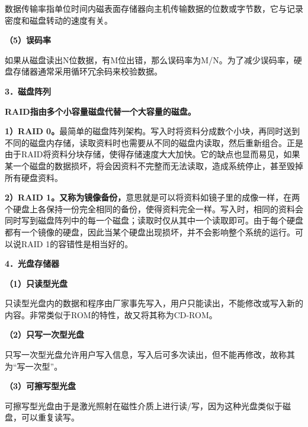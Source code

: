 数据传输率指单位时间内磁表面存储器向主机传输数据的位数或字节数，它与记录密度和磁盘转动的速度有关。

\textbf{（5）误码率}

如果从磁盘读出N位数据，有M位出错，那么误码率为M/N。为了减少误码率，硬盘存储器通常采用循环冗余码来校验数据。

\textbf{{3．磁盘阵列}}

\textbf{RAID指由多个小容量磁盘代替一个大容量的磁盘。}

\textbf{1）RAID
0。}最简单的磁盘阵列架构。写入时将资料分成数个小块，再同时送到不同的磁盘内存储，读取资料时也需要从不同的磁盘内读取，然后重新组合。正是由于RAID将资料分块存储，使得存储速度大大加快。它的缺点也显而易见，如果某一个磁盘的数据损坏，将会因资料不完整而无法读取，造成系统停止，甚至毁掉所有硬盘资料。

\textbf{2）RAID
1。又称为镜像备份，}意思就是可以将资料如镜子里的成像一样，在两个硬盘上各保持一份完全相同的备份，使得资料完全一样。写入时，相同的资料会同时写到磁盘阵列中的每一个磁盘；读取时仅从其中一个读取即可。由于每个硬盘都有一个镜像的硬盘，因此当某个硬盘出现损坏，并不会影响整个系统的运行。可以说RAID
1的容错性是相当好的。

\textbf{{4．光盘存储器}}

\textbf{（1）只读型光盘}

只读型光盘内的数据和程序由厂家事先写入，用户只能读出，不能修改或写入新的内容。非常类似于ROM的特性，故又将其称为CD-ROM。

\textbf{（2）只写一次型光盘}

只写一次型光盘允许用户写入信息，写入后可多次读出，但不能再修改，故称其为``写一次型''。

\textbf{（3）可擦写型光盘}

可擦写型光盘由于是激光照射在磁性介质上进行读/写，因为这种光盘类似于磁盘，可以重复读写。
